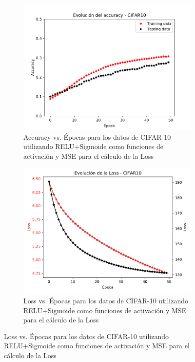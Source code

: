 \begin{figure}[H]
     \centering
     \begin{subfigure}[b]{0.45\textwidth}
         \centering
         \includegraphics[width=\textwidth]{image/EJ5_Acc_RELU_SIG_MSE.pdf}
         \caption{Accuracy vs. Épocas para los datos de CIFAR-10 utilizando RELU+Sigmoide como funciones de activación y MSE para el cálculo de la Loss}
         \label{fig:acc6a}
     \end{subfigure}
     \hfill
     \begin{subfigure}[b]{0.45\textwidth}
         \centering
         \includegraphics[width=\textwidth]{image/EJ5_Loss_RELU_SIG_MSE.pdf}
         \caption{Loss vs. Épocas para los datos de CIFAR-10 utilizando RELU+Sigmoide como funciones de activación y MSE para el cálculo de la Loss}

\end{subfigure}
\end{figure}
